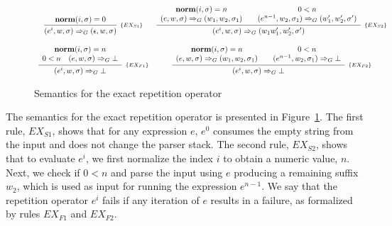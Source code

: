 \documentclass[sigplan,screen]{acmart}
\theoremstyle{definition}
\begin{document}
\begin{figure}[h!]
  \[
    \begin{array}{cccc}
      \infer[_{\{EX_{S1}\}}]
            {(e^i, w, \sigma)\Rightarrow_G (\epsilon,w,\sigma)}
            {\mathbf{norm}(i,\sigma) = 0} &
      \multicolumn{3}{c}{
        \infer[_{\{EX_{S2}\}}]
              {(e^i,w,\sigma) \Rightarrow_G (w_1w'_1,w'_2,\sigma')}
              {\begin{array}{c}
                \mathbf{norm}(i,\sigma) = n \\
                (e,w,\sigma)\Rightarrow_G(w_1,w_2,\sigma_1)
               \end{array} &
               \begin{array}{c}
                 0 < n \\
                 (e^{n - 1},w_2,\sigma_1)\Rightarrow_G (w'_1,w'_2,\sigma')
               \end{array}}
      } \\
      & & \\
          \infer[_{\{EX_{F1}\}}]
                {(e^i,w,\sigma)\Rightarrow_G \bot}
                {\begin{array}{c}
                  \mathbf{norm}(i,\sigma) = n \\
                  0 < n \quad (e,w,\sigma)\Rightarrow_G \bot
                \end{array}} &
          \multicolumn{3}{c}{
            \infer[_{\{EX_{F2}\}}]
                  {(e^i,w,\sigma) \Rightarrow_G \bot}
                  {\begin{array}{c}
                    \mathbf{norm}(i,\sigma) = n \\
                    (e,w,\sigma)\Rightarrow_G(w_1,w_2,\sigma_1)
                  \end{array} &
                  \begin{array}{c}
                    0 < n \\
                    (e^{n - 1},w_2,\sigma_1)\Rightarrow_G \bot
                  \end{array}}
          }
    \end{array}
  \]
  \caption{Semantics for the exact repetition operator}
  \label{fig:exactsemantics}
\end{figure}

The semantics for the exact repetition operator is presented in
Figure~\ref{fig:exactsemantics}.
The first rule, $EX_{S1}$, shows that for any expression $e$, $e^0$ consumes the
empty string from the input and does not change the parser stack. The second rule,
$EX_{S2}$, shows that to evaluate $e^i$, we first normalize the index $i$ to obtain
a numeric value, $n$. Next, we check if $0 < n$ and parse the input using $e$ producing
a remaining suffix $w_2$, which is used as input for running the expression $e^{n - 1}$.
We say that the repetition operator $e^i$ fails if any iteration of $e$ results in a failure,
as formalized by rules $EX_{F1}$ and $EX_{F2}$.
\end{document}
